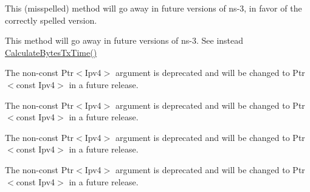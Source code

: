 
\begin{DoxyRefList}
\item[\label{deprecated__deprecated000005}%
\hypertarget{deprecated__deprecated000005}{}%
Member \hyperlink{classns3_1_1ArpCache_1_1Entry_ae9d1394aee7893efbde4b877e718239c}{ns3\+:\+:Arp\+Cache\+:\+:Entry\+:\+:Set\+Mac\+Addresss} (\hyperlink{classns3_1_1Address}{Address} mac\+Address)]This (misspelled) method will go away in future versions of ns-\/3, in favor of the correctly spelled version.  
\item[\label{deprecated__deprecated000022}%
\hypertarget{deprecated__deprecated000022}{}%
Member \hyperlink{classns3_1_1DataRate_ae14a4806b20b7de4b8b45880db3af9a3}{ns3\+:\+:Data\+Rate\+:\+:Calculate\+Tx\+Time} (uint32\+\_\+t bytes) const ]This method will go away in future versions of ns-\/3. See instead \hyperlink{classns3_1_1DataRate_a5daa3d3b37b7df8bb75d94a6540fd17e}{Calculate\+Bytes\+Tx\+Time()}  
\item[\label{deprecated__deprecated000007}%
\hypertarget{deprecated__deprecated000007}{}%
Member \hyperlink{classns3_1_1Ipv4L3Protocol_a50425a8bb439831d9134fc6061481c53}{ns3\+:\+:Ipv4\+L3\+Protocol\+:\+:Drop\+Traced\+Callback} )(const \hyperlink{classns3_1_1Ipv4Header}{Ipv4\+Header} \&header, Ptr$<$ const Packet $>$ packet, Drop\+Reason reason, Ptr$<$ Ipv4 $>$ ipv4, uint32\+\_\+t interface)]The non-\/const {\ttfamily Ptr$<$\+Ipv4$>$} argument is deprecated and will be changed to {\ttfamily Ptr$<$const Ipv4$>$} in a future release.  
\item[\label{deprecated__deprecated000010}%
\hypertarget{deprecated__deprecated000010}{}%
Member \hyperlink{classns3_1_1Ipv4L3Protocol_a80984e2de6a2562b04195b975014cb1b}{ns3\+:\+:Ipv4\+L3\+Protocol\+:\+:m\+\_\+drop\+Trace} ]The non-\/const {\ttfamily Ptr$<$\+Ipv4$>$} argument is deprecated and will be changed to {\ttfamily Ptr$<$const Ipv4$>$} in a future release.  
\item[\label{deprecated__deprecated000009}%
\hypertarget{deprecated__deprecated000009}{}%
Member \hyperlink{classns3_1_1Ipv4L3Protocol_a8a973a63eb239c315d630c9ff300823a}{ns3\+:\+:Ipv4\+L3\+Protocol\+:\+:m\+\_\+rx\+Trace} ]The non-\/const {\ttfamily Ptr$<$\+Ipv4$>$} argument is deprecated and will be changed to {\ttfamily Ptr$<$const Ipv4$>$} in a future release.  
\item[\label{deprecated__deprecated000008}%
\hypertarget{deprecated__deprecated000008}{}%
Member \hyperlink{classns3_1_1Ipv4L3Protocol_a91a19b062bd7e55da11615385e0e2788}{ns3\+:\+:Ipv4\+L3\+Protocol\+:\+:m\+\_\+tx\+Trace} ]The non-\/const {\ttfamily Ptr$<$\+Ipv4$>$} argument is deprecated and will be changed to {\ttfamily Ptr$<$const Ipv4$>$} in a future release.  

\end{DoxyRefList}
